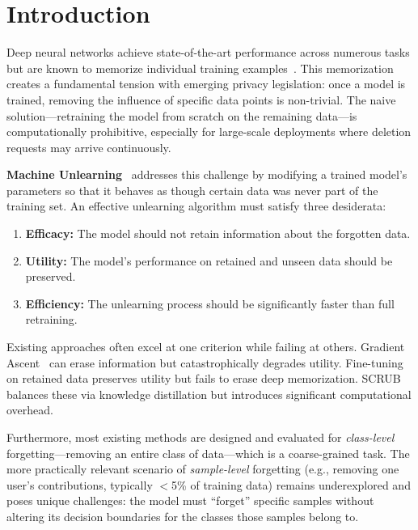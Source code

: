 \documentclass[11pt]{article}
\begin{document}
\section{Introduction}
\label{sec:introduction}

Deep neural networks achieve state-of-the-art performance across numerous tasks but are known to memorize individual training examples~\citep{carlini2022membership, feldman2020does}. This memorization creates a fundamental tension with emerging privacy legislation: once a model is trained, removing the influence of specific data points is non-trivial. The naive solution---retraining the model from scratch on the remaining data---is computationally prohibitive, especially for large-scale deployments where deletion requests may arrive continuously.

\textbf{Machine Unlearning}~\citep{bourtoule2021machine, cao2015towards} addresses this challenge by modifying a trained model's parameters so that it behaves as though certain data was never part of the training set. An effective unlearning algorithm must satisfy three desiderata:
\begin{enumerate}[leftmargin=*]
    \item \textbf{Efficacy:} The model should not retain information about the forgotten data.
    \item \textbf{Utility:} The model's performance on retained and unseen data should be preserved.
    \item \textbf{Efficiency:} The unlearning process should be significantly faster than full retraining.
\end{enumerate}

Existing approaches often excel at one criterion while failing at others. Gradient Ascent~\citep{thudi2022unrolling} can erase information but catastrophically degrades utility. Fine-tuning on retained data preserves utility but fails to erase deep memorization. SCRUB~\citep{kurmanji2023towards} balances these via knowledge distillation but introduces significant computational overhead.

Furthermore, most existing methods are designed and evaluated for \textit{class-level} forgetting---removing an entire class of data---which is a coarse-grained task. The more practically relevant scenario of \textit{sample-level} forgetting (e.g., removing one user's contributions, typically $<$5\% of training data) remains underexplored and poses unique challenges: the model must ``forget'' specific samples without altering its decision boundaries for the classes those samples belong to.
\end{document}
